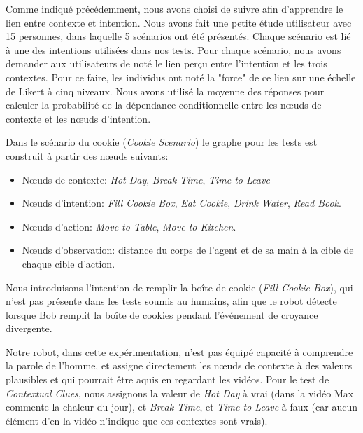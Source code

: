\documentclass[a4paper,11pt,twoside]{StyleThese}
\begin{document}
Comme indiqué précédemment, nous avons choisi de suivre \cite{Liu2014} afin d'apprendre le lien entre contexte et intention. Nous avons fait une petite étude utilisateur avec 15 personnes, dans laquelle 5 scénarios ont été présentés. Chaque scénario est lié à une des intentions utilisées dans nos tests. Pour chaque scénario, nous avons demander aux utilisateurs de noté le lien perçu entre l'intention et les trois contextes. Pour ce faire, les individus ont noté la "force" de ce lien sur une échelle de Likert à cinq niveaux. Nous avons utilisé la moyenne des réponses pour calculer la probabilité de la dépendance conditionnelle entre les nœuds de contexte et les nœuds d'intention.


Dans le scénario  du cookie (\textit{Cookie Scenario}) le graphe pour les tests est construit à partir des nœuds suivants:
\begin{itemize}
\item Nœuds de contexte: \textit{Hot Day}, \textit{Break Time}, \textit{Time to Leave}
\item Nœuds d'intention: \textit{Fill Cookie Box}, \textit{Eat Cookie}, \textit{Drink Water}, \textit{Read Book}.
\item Nœuds d'action: \textit{Move to Table}, \textit{Move to Kitchen}.
\item Nœuds d'observation: distance du corps de l'agent et de sa main à la cible de chaque cible d'action.
\end{itemize}

Nous introduisons l'intention de remplir la boîte de cookie (\textit{Fill Cookie Box}), qui n'est pas présente dans les tests soumis au humains, afin que le robot détecte lorsque Bob remplit la boîte de cookies pendant l'événement de croyance divergente.

Notre robot, dans cette expérimentation, n'est pas équipé capacité à comprendre la parole de l'homme, et assigne directement les nœuds de contexte à des valeurs plausibles et qui pourrait être aquis en regardant les vidéos. Pour le test de \textit{Contextual Clues}, nous assignons la valeur de \textit{Hot Day} à vrai (dans la vidéo Max commente la chaleur du jour), et \textit{Break Time}, et \textit{Time to Leave} à faux (car aucun élément d'en la vidéo n'indique que ces contextes sont vrais).

\end{document}
